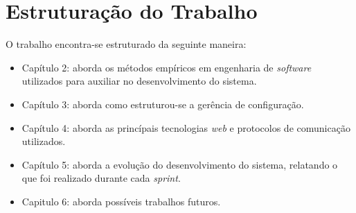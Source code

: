 \section{Estruturação do Trabalho}
O trabalho encontra-se estruturado da seguinte maneira:

\begin{itemize}
    \item Capítulo 2: aborda os métodos empíricos em engenharia de \textit{software} utilizados para
    auxiliar no desenvolvimento do sistema.
    \item Capítulo 3: aborda como estruturou-se a gerência de configuração.
    \item Capítulo 4: aborda as princípais tecnologias \textit{web} e protocolos de comunicação utilizados.
    \item Capítulo 5: aborda a evolução do desenvolvimento do sistema, relatando o que foi realizado durante cada \textit{sprint}.
    \item Capitulo 6: aborda possíveis trabalhos futuros.
\end{itemize}